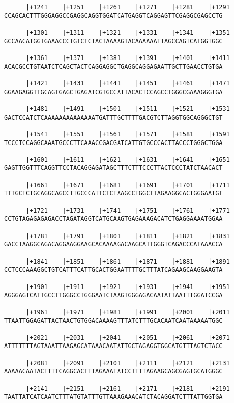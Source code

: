 \documentclass{article}
\begin{document}
\begin{Verbatim}
      |+1241    |+1251    |+1261    |+1271    |+1281    |+1291
CCAGCACTTTGGGAGGCCGAGGCAGGTGGATCATGAGGTCAGGAGTTCGAGGCGAGCCTG

      |+1301    |+1311    |+1321    |+1331    |+1341    |+1351
GCCAACATGGTGAAACCCTGTCTCTACTAAAAGTACAAAAAATTAGCCAGTCATGGTGGC

      |+1361    |+1371    |+1381    |+1391    |+1401    |+1411
ACACGCCTGTAATCTCAGCTACTCAGGAGGCTGAGGCAGGAGAATTGCTTGAACCTGTGA

      |+1421    |+1431    |+1441    |+1451    |+1461    |+1471
GGAAGAGGTTGCAGTGAGCTGAGATCGTGCCATTACACTCCAGCCTGGGCGAAAGGGTGA

      |+1481    |+1491    |+1501    |+1511    |+1521    |+1531
GACTCCATCTCAAAAAAAAAAAAAATGATTTGCTTTTGACGTCTTAGGTGGCAGGGCTGT

      |+1541    |+1551    |+1561    |+1571    |+1581    |+1591
TCCCTCCAGGCAAATGCCCTTCAAACCGACGATCATTGTGCCCACTTACCCTGGGCTGGA

      |+1601    |+1611    |+1621    |+1631    |+1641    |+1651
GAGTTGGTTTCAGGTTCCTACAGGAGATAGCTTTCTTTCCCTTACTCCCTATCTAACACT

      |+1661    |+1671    |+1681    |+1691    |+1701    |+1711
TTTGCTCTGCAGGCAGCCTTGCCCATTCTCTAAGCCTGGCTTAGAAGGCACTGGGAATGT

      |+1721    |+1731    |+1741    |+1751    |+1761    |+1771
CCTGTAGAGAGAGACCTAGATAGGTCATGCAAGTGAGAAAGACATCTGAGGAAAATGGAA

      |+1781    |+1791    |+1801    |+1811    |+1821    |+1831
GACCTAAGGCAGACAGGAAGGAAGCACAAAAGACAAGCATTGGGTCAGACCCATAAACCA

      |+1841    |+1851    |+1861    |+1871    |+1881    |+1891
CCTCCCAAAGGCTGTCATTTCATTGCACTGGAATTTTGCTTTATCAGAAGCAAGGAAGTA

      |+1901    |+1911    |+1921    |+1931    |+1941    |+1951
AGGGAGTCATTGCCTTGGGCCTGGGAATCTAAGTGGGAGACAATATTAATTTGGATCCGA

      |+1961    |+1971    |+1981    |+1991    |+2001    |+2011
TTAATTGGAGATTACTAACTGTGGACAAAAGTTTATCTTTGCACAATCAATAAAAATGGC

      |+2021    |+2031    |+2041    |+2051    |+2061    |+2071
ATTTTTTTAGTAAATTAAGAGCATAAACAATATTGCTAGAGGTGGCATGTTTAGTCTACC

      |+2081    |+2091    |+2101    |+2111    |+2121    |+2131
AAAAACAATACTTTTCAGGCACTTTAGAAATATCCTTTTAGAAGCAGCGAGTGCATGGGC

      |+2141    |+2151    |+2161    |+2171    |+2181    |+2191
TAATTATCATCAATCTTTATGTATTTGTTAAAGAAACATCTACAGGATCTTTATTGGTGA


\end{Verbatim}
\end{document}
